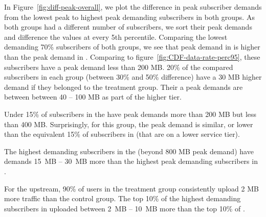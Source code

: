 

In Figure~\ref{fig:diff-peak-overall}, we plot the difference in
peak subscriber demands from the 
lowest peak to highest peak demanding subscribers in both groups.
As both groups had a different number of subscribers, we sort their peak demands
and difference the values at every 5th percentile.
Comparing the lowest demanding 70\% subscribers of both groups, we
see that peak demand in \treatment{} is higher than the peak demand in \control{}.
Comparing to figure~\ref{fig:CDF-data-rate-perc95}, these subscribers have a peak 
demand less than 200 MB. 20\% of the compared subscribers in each group (between 30\% and 50\%
difference) have a 30 MB higher demand if they belonged to the treatment group. 
Their a peak demands are between between 40 -- 100 MB as part of the higher tier.

Under 15\% of subscribers in the \treatment{} have peak demands more than 200 MB
but less than 400 MB. Surprisingly, for this group, the peak demand is similar, 
or lower than the equivalent 15\% of subscribers in \control{} (that are on a lower service
tier).

The highest demanding subscribers in the \treatment{} (beyond 800 MB peak demand)
have demands 15~MB -- 30~MB more than the highest peak demanding subscribers
in \control{}.

For the upstream, 90\% of users in the treatment group consistently upload 2 MB
more traffic than the control group. The top 10\% of the highest demanding subscribers
in \treatment{} uploaded between 2~MB -- 10~MB more than the top 10\% of \control{}.



